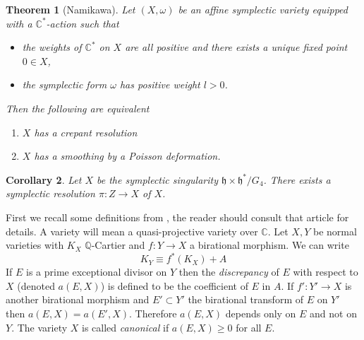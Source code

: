 \documentclass[a4apper,10pt]{amsart}
\newtheorem{thm}{Theorem}
\newtheorem{cor}[thm]{Corollary}
\theoremstyle{definition}
\numberwithin{thm}{section}
\newcommand{\Q}{\mathbb{Q}}
\newcommand{\C}{\mathbb{C}}
\begin{document}
\begin{thm}[Namikawa]
Let $(X,\omega)$ be an affine symplectic variety equipped with a $\C^*$-action such that
\begin{itemize}

\item the weights of $\C^*$ on $X$ are all positive and there exists a unique fixed point $0 \in X$,

\item the symplectic form $\omega$ has positive weight $l > 0$.

\end{itemize}
Then the following are equivalent
\begin{enumerate}

\item $X$ has a crepant resolution

\item $X$ has a smoothing by a Poisson deformation.

\end{enumerate}
\end{thm}





\begin{cor}\label{cor:res}
Let $X$ be the symplectic singularity $\mathfrak{h} \times \mathfrak{h}^* / G_4$. There exists a symplectic resolution $\pi : Z \rightarrow X$ of $X$.
\end{cor}

\noindent First we recall some definitions from \cite[page 236]{18}, the reader should consult that article for details. A variety will mean a quasi-projective variety over $\C$. Let $X,Y$ be normal varieties with $K_X$ $\Q$-Cartier and $f : Y \rightarrow X$ a birational morphism. We can write
\begin{displaymath}
K_Y \equiv f^*(K_X) + A
\end{displaymath} 
If $E$ is a prime exceptional divisor on $Y$ then the \textit{discrepancy} of $E$ with respect to $X$ (denoted $a(E,X)$) is defined to be the coefficient of $E$ in $A$. If $f' : Y' \rightarrow X$ is another birational morphism and $E' \subset Y'$ the birational transform of $E$ on $Y'$ then $a(E,X) = a(E',X)$. Therefore $a(E,X)$ depends only on $E$ and not on $Y$. The variety $X$ is called \textit{canonical} if $a(E,X) \ge 0$ for all $E$.
\end{document}
